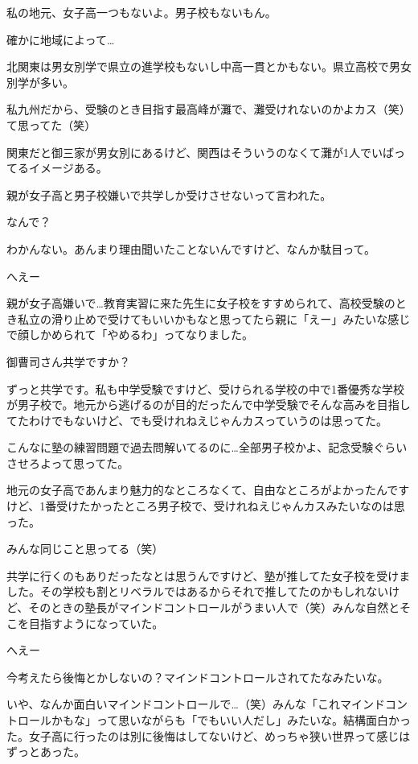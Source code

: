 \begin{multicols}{2}
  私の地元、女子高一つもないよ。男子校もないもん。

  確かに地域によって…

  北関東は男女別学で県立の進学校もないし中高一貫とかもない。県立高校で男女別学が多い。

  私九州だから、受験のとき目指す最高峰が灘で、灘受けれないのかよカス（笑）て思ってた（笑）

  関東だと御三家が男女別にあるけど、関西はそういうのなくて灘が1人でいばってるイメージある。

  親が女子高と男子校嫌いで共学しか受けさせないって言われた。

  なんで？

  わかんない。あんまり理由聞いたことないんですけど、なんか駄目って。

  へえー

  親が女子高嫌いで…教育実習に来た先生に女子校をすすめられて、高校受験のとき私立の滑り止めで受けてもいいかもなと思ってたら親に「えー」みたいな感じで顔しかめられて「やめるわ」ってなりました。

  御曹司さん共学ですか？

  ずっと共学です。私も中学受験ですけど、受けられる学校の中で1番優秀な学校が男子校で。地元から逃げるのが目的だったんで中学受験でそんな高みを目指してたわけでもないけど、でも受けれねえじゃんカスっていうのは思ってた。

  こんなに塾の練習問題で過去問解いてるのに…全部男子校かよ、記念受験ぐらいさせろよって思ってた。

  地元の女子高であんまり魅力的なところなくて、自由なところがよかったんですけど、1番受けたかったところ男子校で、受けれねえじゃんカスみたいなのは思った。

  みんな同じこと思ってる（笑）

  共学に行くのもありだったなとは思うんですけど、塾が推してた女子校を受けました。その学校も割とリベラルではあるからそれで推してたのかもしれないけど、そのときの塾長がマインドコントロールがうまい人で（笑）みんな自然とそこを目指すようになっていた。

  へえー

  今考えたら後悔とかしないの？マインドコントロールされてたなみたいな。

  いや、なんか面白いマインドコントロールで…（笑）みんな「これマインドコントロールかもな」って思いながらも「でもいい人だし」みたいな。結構面白かった。女子高に行ったのは別に後悔はしてないけど、めっちゃ狭い世界って感じはずっとあった。


\end{multicols}
